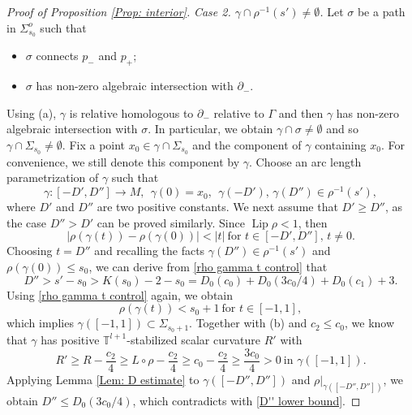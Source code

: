 \documentclass[11pt, reqno]{amsart}
\numberwithin{equation}{section}
\theoremstyle{definition}
\DeclareMathOperator{\Lip}{Lip}
\newcommand{\de}{\partial}
\begin{document}
\begin{proof}[Proof of Proposition \ref{Prop: interior}]
{\it Case 2. $\gamma\cap\rho^{-1}(s')\neq\emptyset$.} Let $\sigma$ be a path in $\Sigma_{s_{0}}^{o}$ such that
\begin{itemize}\setlength{\itemsep}{1mm}
\item $\sigma$ connects $p_{-}$ and $p_{+}$;
\item $\sigma$ has non-zero algebraic intersection with $\de_{-}$.
\end{itemize}
Using (a), $\gamma$ is relative homologous to $\de_{-}$ relative to $\Gamma$ and then $\gamma$ has non-zero algebraic intersection with $\sigma$. In particular, we obtain $\gamma\cap\sigma\neq\emptyset$ and so $\gamma\cap\Sigma_{s_{0}}\neq\emptyset$. Fix a point $x_{0}\in\gamma\cap\Sigma_{s_{0}}$ and the component of $\gamma$ containing $x_{0}$. For convenience, we still denote this component by $\gamma$. Choose an arc length parametrization of $\gamma$ such that
\[
\gamma:[-D',D'']\to M, \ \
\gamma(0) = x_{0}, \ \
\gamma(-D'),\,\gamma(D'') \in \rho^{-1}(s'),
\]
where $D'$ and $D''$ are two positive constants. We next assume that $D'\geq D''$, as the case $D''>D'$ can be proved similarly. Since $\Lip\rho <1$, then
\begin{equation}\label{rho gamma t control}
|\rho(\gamma(t))-\rho(\gamma(0))| < |t| \ \text{for $t\in[-D',D''] ,\, t \neq 0$}.
\end{equation}
Choosing $t=D''$ and recalling the facts $\gamma(D'') \in \rho^{-1}(s')$ and $\rho(\gamma(0))\leq s_0$, we can derive from \eqref{rho gamma t control} that
\begin{equation}\label{D'' lower bound}
D'' > s' - s_{0} > K(s_{0})-2-s_{0} = D_{0}(c_{0})+D_{0}(3c_{0}/4)+D_0(c_1)+3.
\end{equation}
Using \eqref{rho gamma t control} again, we obtain
\[
\rho(\gamma(t)) < s_{0}+1 \ \text{for $t\in[-1,1]$},
\]
which implies $\gamma([-1,1])\subset\Sigma_{s_{0}+1}$. Together with (b) and $c_{2}\leq c_{0}$, we know that $\gamma$ has positive $\mathbb T^{l+1}$-stabilized scalar curvature $R'$ with
\[
R' \geq R-\frac{c_{2}}{4} \geq L\circ \rho-\frac{c_{2}}{4} \geq c_{0}-\frac{c_{2}}{4} \geq \frac{3c_{0}}{4} > 0 \ \text{in $\gamma([-1,1])$}.
\]
Applying Lemma \ref{Lem: D estimate} to $\gamma([-D'',D''])$ and $\rho|_{\gamma([-D'',D''])}$, we obtain $D''\leq D_{0}(3c_{0}/4)$, which contradicts with \eqref{D'' lower bound}.
\end{proof}
\end{document}
